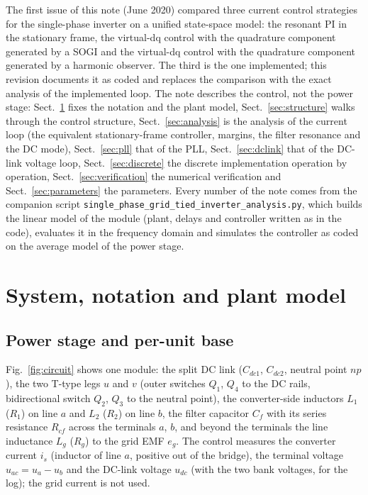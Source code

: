 \documentclass[10pt,a4paper]{scrartcl}
\newcommand{\code}[1]{\texttt{#1}}
\begin{document}
\begin{onehalfspace}
The first issue of this note (June 2020) compared three current control strategies for the single-phase inverter on a unified state-space model: the resonant PI in the stationary frame, the virtual-dq control with the quadrature component generated by a SOGI and the virtual-dq control with the quadrature component generated by a harmonic observer. The third is the one implemented; this revision documents it as coded and replaces the comparison with the exact analysis of the implemented loop. The note describes the control, not the power stage: Sect.~\ref{sec:system} fixes the notation and the plant model, Sect.~\ref{sec:structure} walks through the control structure, Sect.~\ref{sec:analysis} is the analysis of the current loop (the equivalent stationary-frame controller, margins, the filter resonance and the DC mode), Sect.~\ref{sec:pll} that of the PLL, Sect.~\ref{sec:dclink} that of the DC-link voltage loop, Sect.~\ref{sec:discrete} the discrete implementation operation by operation, Sect.~\ref{sec:verification} the numerical verification and Sect.~\ref{sec:parameters} the parameters. Every number of the note comes from the companion script \code{single\_phase\_grid\_tied\_inverter\_analysis.py}, which builds the linear model of the module (plant, delays and controller written as in the code), evaluates it in the frequency domain and simulates the controller as coded on the average model of the power stage.

\section{System, notation and plant model}
\label{sec:system}

\subsection{Power stage and per-unit base}
\label{sec:powerstage}

Fig.~\ref{fig:circuit} shows one module: the split DC link ($C_{dc1}$, $C_{dc2}$, neutral point $np$), the two T-type legs $u$ and $v$ (outer switches $Q_1$, $Q_4$ to the DC rails, bidirectional switch $Q_2$, $Q_3$ to the neutral point), the converter-side inductors $L_1$ ($R_1$) on line $a$ and $L_2$ ($R_2$) on line $b$, the filter capacitor $C_f$ with its series resistance $R_{cf}$ across the terminals $a$, $b$, and beyond the terminals the line inductance $L_g$ ($R_g$) to the grid EMF $e_g$. The control measures the converter current $i_s$ (inductor of line $a$, positive out of the bridge), the terminal voltage $u_{ac} = u_a - u_b$ and the DC-link voltage $u_{dc}$ (with the two bank voltages, for the log); the grid current is not used.


\end{onehalfspace}
\end{document}
